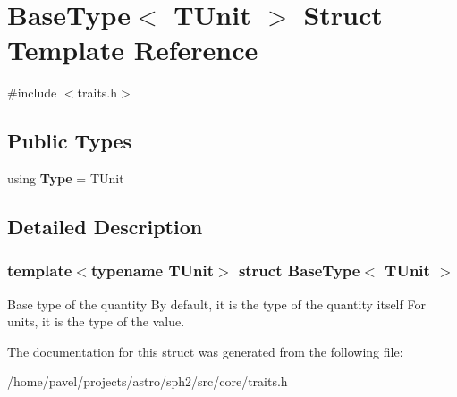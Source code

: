 \hypertarget{structBaseType}{}\section{Base\+Type$<$ T\+Unit $>$ Struct Template Reference}
\label{structBaseType}


{\ttfamily \#include $<$traits.\+h$>$}

\subsection*{Public Types}
\begin{DoxyCompactItemize}
\item 
\hypertarget{structBaseType_a2d02b49267d883c4aabbfa503c3e16bf}{}\label{structBaseType_a2d02b49267d883c4aabbfa503c3e16bf} 
using {\bfseries Type} = T\+Unit
\end{DoxyCompactItemize}


\subsection{Detailed Description}
\subsubsection*{template$<$typename T\+Unit$>$\newline
struct Base\+Type$<$ T\+Unit $>$}

Base type of the quantity By default, it is the type of the quantity itself For units, it is the type of the value. 

The documentation for this struct was generated from the following file\+:\begin{DoxyCompactItemize}
\item 
/home/pavel/projects/astro/sph2/src/core/traits.\+h\end{DoxyCompactItemize}
